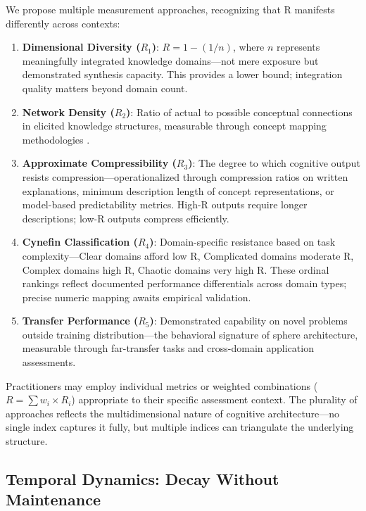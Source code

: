 We propose multiple measurement approaches, recognizing that R manifests differently across contexts:

\begin{enumerate}
    \item \textbf{Dimensional Diversity ($R_1$)}: $R = 1 - (1/n)$, where $n$ represents meaningfully integrated knowledge domains—not mere exposure but demonstrated synthesis capacity. This provides a lower bound; integration quality matters beyond domain count.
    
    \item \textbf{Network Density ($R_2$)}: Ratio of actual to possible conceptual connections in elicited knowledge structures, measurable through concept mapping methodologies \citep{novak1984}.
    
    \item \textbf{Approximate Compressibility ($R_3$)}: The degree to which cognitive output resists compression—operationalized through compression ratios on written explanations, minimum description length of concept representations, or model-based predictability metrics. High-R outputs require longer descriptions; low-R outputs compress efficiently.
    
    \item \textbf{Cynefin Classification ($R_4$)}: Domain-specific resistance based on task complexity—Clear domains afford low R, Complicated domains moderate R, Complex domains high R, Chaotic domains very high R. These ordinal rankings reflect documented performance differentials across domain types; precise numeric mapping awaits empirical validation.
    
    \item \textbf{Transfer Performance ($R_5$)}: Demonstrated capability on novel problems outside training distribution—the behavioral signature of sphere architecture, measurable through far-transfer tasks and cross-domain application assessments.
\end{enumerate}

Practitioners may employ individual metrics or weighted combinations ($R = \sum w_i \times R_i$) appropriate to their specific assessment context. The plurality of approaches reflects the multidimensional nature of cognitive architecture—no single index captures it fully, but multiple indices can triangulate the underlying structure.

\subsection{Temporal Dynamics: Decay Without Maintenance}

